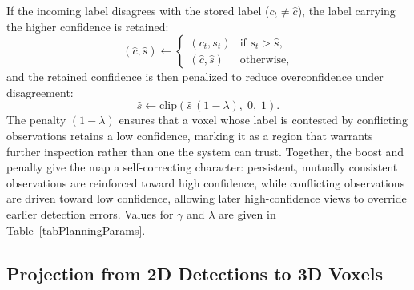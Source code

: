 If the incoming label disagrees with the stored label ($c_t \neq \hat{c}$),
the label carrying the higher confidence is retained:
\begin{equation}
(\hat{c}, \hat{s}) \leftarrow
\begin{cases}
(c_t, s_t) & \text{if } s_t > \hat{s},\\
(\hat{c}, \hat{s}) & \text{otherwise},
\end{cases}
\label{eqSemMismatch}
\end{equation}
and the retained confidence is then penalized to reduce overconfidence
under disagreement:
\begin{equation}
\hat{s} \leftarrow \mathrm{clip}\!\left(\hat{s}\,(1-\lambda),\; 0,\; 1\right).
\label{eqSemPenalty}
\end{equation}
The penalty $(1-\lambda)$ ensures that a voxel whose label is contested by
conflicting observations retains a low confidence, marking it as a region
that warrants further inspection rather than one the system can trust.
Together, the boost and penalty give the map a self-correcting character:
persistent, mutually consistent observations are reinforced toward high
confidence, while conflicting observations are driven toward low
confidence, allowing later high-confidence views to override earlier
detection errors.
Values for $\gamma$ and $\lambda$ are given in
Table~\ref{tabPlanningParams}.


\subsection{Projection from 2D Detections to 3D Voxels}
\label{secProjection}

